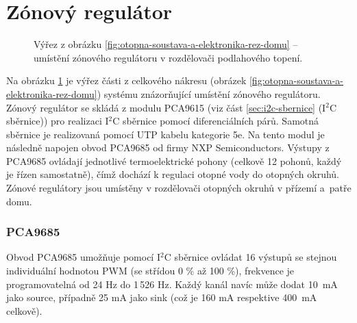 \section{Zónový regulátor}
\begin{figure}[H]
   \centering
    \def\svgwidth{0.5\columnwidth}
   
    \caption[Výřez pro umístění zónového regulátoru v rozdělovači podlahového topení.]{Výřez z obrázku \ref{fig:otopna-soustava-a-elektronika-rez-domu} – umístění zónového regulátoru v rozdělovači podlahového topení.}
    \label{fig:vyrez-zonovy-regulator}
\end{figure}
Na obrázku \ref{fig:vyrez-zonovy-regulator} je výřez části z celkového nákresu (obrázek \ref{fig:otopna-soustava-a-elektronika-rez-domu}) systému znázorňující umístění zónového regulátoru. Zónový regulátor se skládá z modulu PCA9615 (viz část  \ref{sec:i2c-sbernice} (I$^2$C sběrnice)) pro realizaci I$^2$C sběrnice pomocí diferenciálních párů. Samotná sběrnice je realizovaná pomocí UTP kabelu kategorie 5e. Na tento modul je následně napojen obvod PCA9685 od firmy NXP Semiconductors. Výstupy z PCA9685 ovládají jednotlivé termoelektrické pohony (celkově 12 pohonů, každý je řízen samostatně), čímž dochází k regulaci otopné vody do otopných okruhů. Zónové regulátory jsou umístěny v rozdělovači otopných okruhů v přízemí a~patře domu.

\subsubsection{PCA9685}
Obvod PCA9685 umožňuje pomocí I$^2$C sběrnice ovládat 16 výstupů se stejnou individuální hodnotou PWM (se střídou 0 \% až 100 \%), frekvence je programovatelná od 24 Hz do 1\,526 Hz. Každý kanál navíc může dodat 10~mA jako source, případně 25 mA jako sink (což je 160 mA respektive 400~mA celkově).


